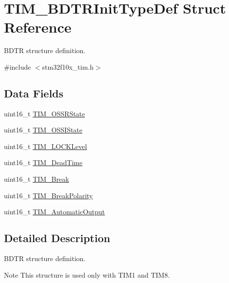 \hypertarget{struct_t_i_m___b_d_t_r_init_type_def}{}\section{T\+I\+M\+\_\+\+B\+D\+T\+R\+Init\+Type\+Def Struct Reference}
\label{struct_t_i_m___b_d_t_r_init_type_def}


B\+D\+TR structure definition.  




{\ttfamily \#include $<$stm32f10x\+\_\+tim.\+h$>$}

\subsection*{Data Fields}
\begin{DoxyCompactItemize}
\item 
uint16\+\_\+t \mbox{\hyperlink{struct_t_i_m___b_d_t_r_init_type_def_a5d0ca05d766b82cde0a56a6b61c02f8b}{T\+I\+M\+\_\+\+O\+S\+S\+R\+State}}
\item 
uint16\+\_\+t \mbox{\hyperlink{struct_t_i_m___b_d_t_r_init_type_def_afc160a2e65a93ea65c81bf05aa6f085d}{T\+I\+M\+\_\+\+O\+S\+S\+I\+State}}
\item 
uint16\+\_\+t \mbox{\hyperlink{struct_t_i_m___b_d_t_r_init_type_def_acba399df603976d328261af5cd9ae011}{T\+I\+M\+\_\+\+L\+O\+C\+K\+Level}}
\item 
uint16\+\_\+t \mbox{\hyperlink{struct_t_i_m___b_d_t_r_init_type_def_a136119743510d706b94e605f86b31f82}{T\+I\+M\+\_\+\+Dead\+Time}}
\item 
uint16\+\_\+t \mbox{\hyperlink{struct_t_i_m___b_d_t_r_init_type_def_a7f141e06bab7928bc0b8327f0d20e664}{T\+I\+M\+\_\+\+Break}}
\item 
uint16\+\_\+t \mbox{\hyperlink{struct_t_i_m___b_d_t_r_init_type_def_a71f25c4b4d7207152436dd716a6cb2f1}{T\+I\+M\+\_\+\+Break\+Polarity}}
\item 
uint16\+\_\+t \mbox{\hyperlink{struct_t_i_m___b_d_t_r_init_type_def_a85ef0b5598749ffd67dd360e615bcf9a}{T\+I\+M\+\_\+\+Automatic\+Output}}
\end{DoxyCompactItemize}


\subsection{Detailed Description}
B\+D\+TR structure definition. 

\begin{DoxyNote}{Note}
This structure is used only with T\+I\+M1 and T\+I\+M8. 
\end{DoxyNote}


